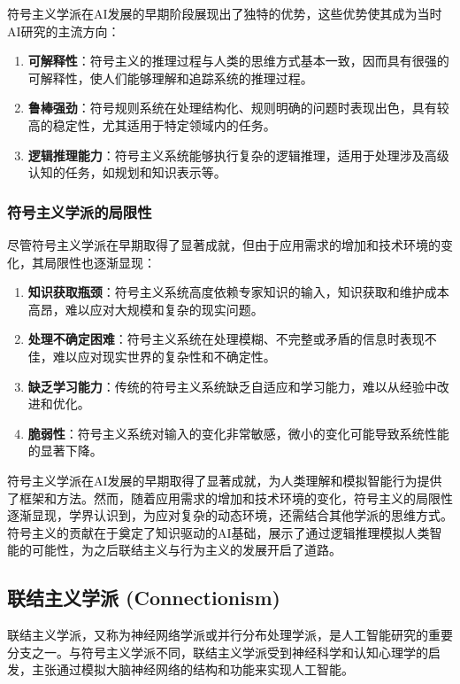 符号主义学派在AI发展的早期阶段展现出了独特的优势，这些优势使其成为当时AI研究的主流方向：

\begin{enumerate}
\item   {\bf 可解释性}：符号主义的推理过程与人类的思维方式基本一致，因而具有很强的可解释性，使人们能够理解和追踪系统的推理过程。
\item   {\bf 鲁棒强劲}：符号规则系统在处理结构化、规则明确的问题时表现出色，具有较高的稳定性，尤其适用于特定领域内的任务。
\item {\bf 逻辑推理能力}：符号主义系统能够执行复杂的逻辑推理，适用于处理涉及高级认知的任务，如规划和知识表示等。
\end{enumerate}

\subsubsection*{符号主义学派的局限性}

尽管符号主义学派在早期取得了显著成就，但由于应用需求的增加和技术环境的变化，其局限性也逐渐显现：

\begin{enumerate}
\item {\bf 知识获取瓶颈}：符号主义系统高度依赖专家知识的输入，知识获取和维护成本高昂，难以应对大规模和复杂的现实问题。
\item {\bf 处理不确定困难}：符号主义系统在处理模糊、不完整或矛盾的信息时表现不佳，难以应对现实世界的复杂性和不确定性。
\item {\bf 缺乏学习能力}：传统的符号主义系统缺乏自适应和学习能力，难以从经验中改进和优化。
\item {\bf 脆弱性}：符号主义系统对输入的变化非常敏感，微小的变化可能导致系统性能的显著下降。
\end{enumerate}

符号主义学派在AI发展的早期取得了显著成就，为人类理解和模拟智能行为提供了框架和方法。然而，随着应用需求的增加和技术环境的变化，符号主义的局限性逐渐显现，学界认识到，为应对复杂的动态环境，还需结合其他学派的思维方式。符号主义的贡献在于奠定了知识驱动的AI基础，展示了通过逻辑推理模拟人类智能的可能性，为之后联结主义与行为主义的发展开启了道路。

\subsection{联结主义学派 (Connectionism)}

联结主义学派，又称为神经网络学派或并行分布处理学派，是人工智能研究的重要分支之一。与符号主义学派不同，联结主义学派受到神经科学和认知心理学的启发，主张通过模拟大脑神经网络的结构和功能来实现人工智能。

